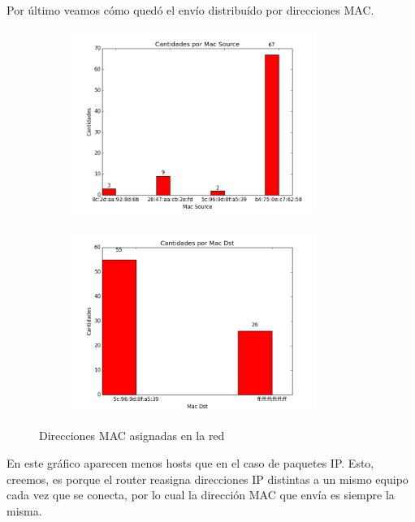 \newpage

Por \'ultimo veamos c\'omo qued\'o el env\'io distribu\'ido por direcciones MAC.

\begin{figure}[H]

\begin{subfigure}{0.6\textwidth}
\includegraphics[width=0.9\linewidth, height=6cm]{imagenes/exp1/9cantidadMacSource} 
\caption{}
\end{subfigure}
\begin{subfigure}{0.6\textwidth}
\includegraphics[width=0.9\linewidth, height=6cm]{imagenes/exp1/10cantidadMacDst}
\caption{}
\end{subfigure}

\caption{Direcciones MAC asignadas en la red}
\label{fig:1}
\end{figure}

En este gr\'afico aparecen menos hosts que en el caso de paquetes IP. Esto, creemos, es porque el router reasigna direcciones IP distintas a un mismo equipo cada vez que se conecta, por lo cual la direcci\'on MAC que env\'ia es siempre la misma.

